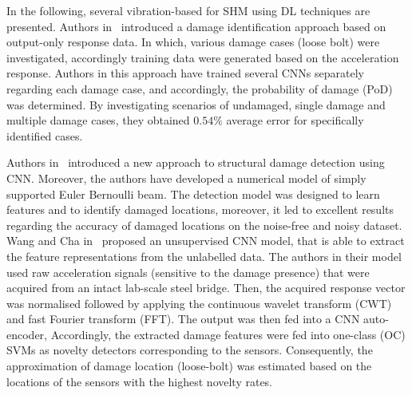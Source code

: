 In the following, several vibration-based for SHM using DL techniques are presented.
Authors in~\cite{Abdeljaber2017} introduced a damage identification approach based on output-only response data.
In which, various damage cases (loose bolt) were investigated, accordingly training data were generated based on the acceleration response.
Authors in this approach have trained several CNNs separately regarding each damage case, and accordingly, the probability of damage (PoD) was determined.
By investigating scenarios of undamaged, single damage and multiple damage cases, they obtained \(0.54\%\) average error for specifically identified cases.

Authors in~\cite{Lin2017} introduced a new approach to structural damage detection using CNN.
Moreover, the authors have developed a numerical model of simply supported Euler Bernoulli beam.
The detection model was designed to learn features and to identify damaged locations, moreover, it led to excellent results regarding the accuracy of damaged locations on the noise-free and noisy dataset.
Wang and Cha in~\cite{Cha2018} proposed an unsupervised CNN model, that is able to extract the feature representations from the unlabelled data.
The authors in their model used raw acceleration signals (sensitive to the damage presence) that were acquired from an intact lab-scale steel bridge.
Then, the acquired response vector was normalised followed by applying the continuous wavelet transform (CWT) and fast Fourier transform (FFT).
The output was then fed into a CNN auto-encoder,
Accordingly, the extracted damage features were fed into one-class (OC) SVMs as novelty detectors corresponding to the sensors.
Consequently, the approximation of damage location (loose-bolt) was estimated based on the locations of the sensors with the highest novelty rates.

